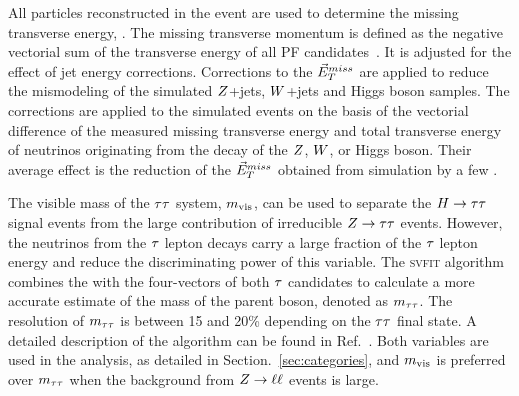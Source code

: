 All particles reconstructed in the event are used to determine the missing transverse energy,
\etvecmiss. The missing transverse momentum is defined as the negative vectorial sum of the transverse energy of
all PF candidates~\cite{Khachatryan:2014gga}. It is adjusted for the effect of jet energy corrections.
Corrections to the $\vec{E}^{miss}_T$ are applied to reduce the mismodeling of the simulated
$Z$+jets, $W$+jets and Higgs boson samples.
The corrections are applied to the simulated events on the basis of the vectorial difference
of the measured missing transverse energy and total transverse energy of neutrinos
originating from the decay of the $Z$, $W$, or Higgs boson. Their average effect is the reduction of the $\vec{E}^{miss}_T$ obtained from simulation by a few \GeV.

The visible mass of the $\tau\tau$ system, $m_\text{vis}$, can be used to separate
the $H\to \tau \tau$ signal events
from the large contribution of irreducible $Z \to \tau \tau$ events.
However, the neutrinos from the $\tau$ lepton decays carry a large fraction of
the $\tau$ lepton energy and reduce the discriminating power of this variable.
The \textsc{svfit} algorithm combines the \etvecmiss with the four-vectors of both $\tau$ candidates
to calculate a more accurate estimate of the mass of the parent boson, denoted as $m_{\tau\tau}$. The resolution of $m_{\tau\tau}$ is between 15 and 20\% depending on the $\tau\tau$ final state.
A detailed description of the algorithm can be found
in Ref.~\cite{Bianchini:2014vza}. Both variables are used in the analysis, as detailed in Section.~\ref{sec:categories}, and $m_\text{vis}$ is preferred over $m_{\tau\tau}$ when the background from $Z \to \ell\ell$ events is large.
